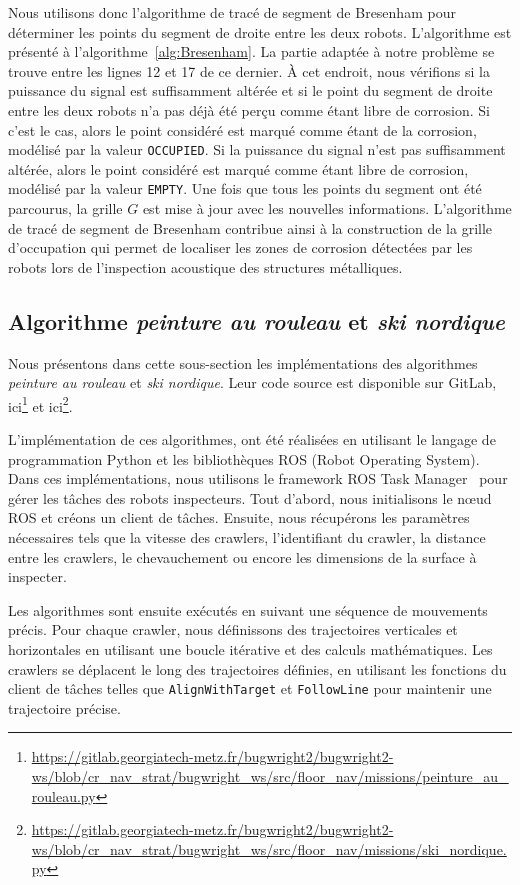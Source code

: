 \documentclass[francais,RandD]{rapportPFE}
\begin{document}
			Nous utilisons donc l'algorithme de tracé de segment de Bresenham pour déterminer les points du segment de droite entre les deux robots.
			L'algorithme est présenté à l'algorithme~\ref{alg:Bresenham}.
			La partie adaptée à notre problème se trouve entre les lignes 12 et 17 de ce dernier.
			À cet endroit, nous vérifions si la puissance du signal est suffisamment altérée et si le point du segment de droite entre les deux robots n'a pas déjà été perçu comme étant libre de corrosion.
			Si c'est le cas, alors le point considéré est marqué comme étant de la corrosion, modélisé par la valeur \texttt{OCCUPIED}.
			Si la puissance du signal n'est pas suffisamment altérée, alors le point considéré est marqué comme étant libre de corrosion, modélisé par la valeur \texttt{EMPTY}.
			Une fois que tous les points du segment ont été parcourus, la grille $G$ est mise à jour avec les nouvelles informations.
			L'algorithme de tracé de segment de Bresenham contribue ainsi à la construction de la grille d'occupation qui permet de localiser les zones de corrosion détectées par les robots lors de l'inspection acoustique des structures métalliques.
		\subsection*{Algorithme \textit{peinture au rouleau} et \textit{ski nordique}}
			Nous présentons dans cette sous-section les implémentations des algorithmes \textit{peinture au rouleau} et \textit{ski nordique}.
			Leur code source est disponible sur GitLab, ici\footnote{\url{https://gitlab.georgiatech-metz.fr/bugwright2/bugwright2-ws/blob/cr_nav_strat/bugwright_ws/src/floor_nav/missions/peinture_au_rouleau.py}} et ici\footnote{\url{https://gitlab.georgiatech-metz.fr/bugwright2/bugwright2-ws/blob/cr_nav_strat/bugwright_ws/src/floor_nav/missions/ski_nordique.py}}.

			L'implémentation de ces algorithmes, ont été réalisées en utilisant le langage de programmation Python et les bibliothèques ROS (Robot Operating System).
			Dans ces implémentations, nous utilisons le framework ROS Task Manager~\cite{ROSTaskManager} pour gérer les tâches des robots inspecteurs.
			Tout d'abord, nous initialisons le nœud ROS et créons un client de tâches.
			Ensuite, nous récupérons les paramètres nécessaires tels que la vitesse des crawlers, l'identifiant du crawler, la distance entre les crawlers, le chevauchement ou encore les dimensions de la surface à inspecter.

			Les algorithmes sont ensuite exécutés en suivant une séquence de mouvements précis.
			Pour chaque crawler, nous définissons des trajectoires verticales et horizontales en utilisant une boucle itérative et des calculs mathématiques. Les crawlers se déplacent le long des trajectoires définies, en utilisant les fonctions du client de tâches telles que \texttt{AlignWithTarget} et \texttt{FollowLine} pour maintenir une trajectoire précise.
\end{document}

